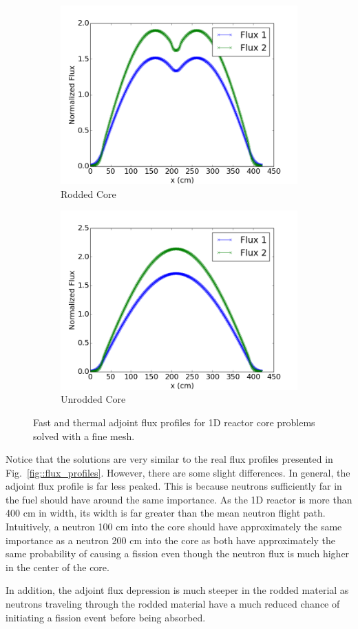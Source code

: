 \documentclass[12pt]{report}
\begin{document}
			\begin{figure}[ht]
				\centering
				\begin{subfigure}{.5\textwidth}
					\centering
					\includegraphics[width=.9\linewidth]{rod_adjoint_flux.png}
					\caption{Rodded Core}
					\label{fig::rod_adj_flux}
				\end{subfigure}%
				\begin{subfigure}{.5\textwidth}
					\centering
					\includegraphics[width=.9\linewidth]{urod_adjoint_flux.png}
					\caption{Unrodded Core}
					\label{fig::urod_adj_flux}
				\end{subfigure}
				\caption{Fast and thermal adjoint flux profiles for 1D reactor core problems solved with a fine mesh.}
				\label{fig::adj_flux}
			\end{figure}
			
	Notice that the solutions are very similar to the real flux profiles presented in Fig.~\ref{fig::flux_profiles}. However, there are some slight differences. In general, the adjoint flux profile is far less peaked. This is because neutrons sufficiently far in the fuel should have around the same importance. As the 1D reactor is more than 400 cm in width, its width is far greater than the mean neutron flight path. Intuitively, a neutron 100 cm into the core should have approximately the same importance as a neutron 200 cm into the core as both have approximately the same probability of causing a fission even though the neutron flux is much higher in the center of the core. 
	
	In addition, the adjoint flux depression is much steeper in the rodded material as neutrons traveling through the rodded material have a much reduced chance of initiating a fission event before being absorbed.
	
	
\end{document}
